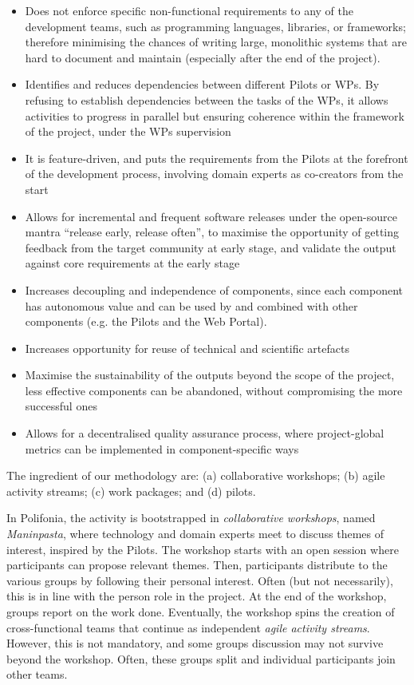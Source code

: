 \begin{itemize}
    \item Does not enforce specific non-functional requirements to any of the development teams, such as programming languages, libraries, or frameworks; therefore minimising the chances of writing large, monolithic systems that are hard to document and maintain (especially after the end of the project). 
    \item Identifies and reduces dependencies between different Pilots or WPs. By refusing to establish dependencies between the tasks of the WPs, it allows activities to progress in parallel but ensuring coherence within the framework of the project, under the WPs supervision
    \item It is feature-driven, and puts the requirements from the Pilots at the forefront of the development process, involving domain experts as co-creators from the start
    \item Allows for incremental and frequent software releases under the open-source mantra ``release early, release often'', to maximise the opportunity of getting feedback from the target community at early stage, and validate the output against core requirements at the early stage
    \item Increases decoupling and independence of components, since each component has autonomous value and can be used by and combined with other components (e.g. the Pilots and the Web Portal). 
    \item Increases opportunity for reuse of technical and scientific artefacts
    \item Maximise the sustainability of the outputs beyond the scope of the project, less effective components can be abandoned, without compromising the more successful ones
    \item Allows for a decentralised quality assurance process, where project-global metrics can be implemented in component-specific ways
\end{itemize}


The ingredient of our methodology are: (a) collaborative workshops; (b) agile activity streams; (c) work packages; and (d) pilots.

In Polifonia, the activity is bootstrapped in \textit{collaborative workshops}, named \textit{Maninpasta}, where technology and domain experts meet to discuss themes of interest, inspired by the Pilots. 
The workshop starts with an open session where participants can propose relevant themes. 
Then, participants distribute to the various groups by following their personal interest.
Often (but not necessarily), this is in line with the person role in the project.
At the end of the workshop, groups report on the work done. 
Eventually, the workshop spins the creation of cross-functional teams that continue as independent \textit{agile activity streams}. However, this is not mandatory, and some groups discussion may not survive beyond the workshop. Often, these groups split and individual participants join other teams.

